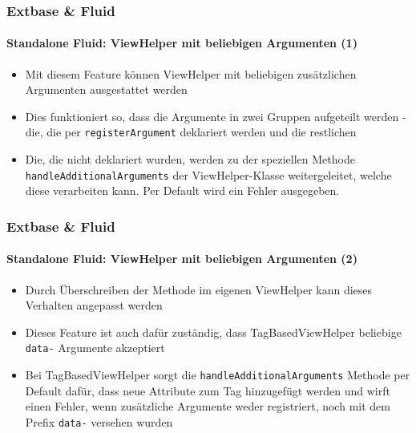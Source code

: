 \begin{frame}[fragile]
	\frametitle{Extbase \& Fluid}
	\framesubtitle{Standalone Fluid: ViewHelper mit beliebigen Argumenten (1)}

	\begin{itemize}

		\item Mit diesem Feature können ViewHelper mit beliebigen zusätzlichen Argumenten ausgestattet werden

		\item Dies funktioniert so, dass die Argumente in zwei Gruppen aufgeteilt werden - die, die per \texttt{registerArgument} deklariert werden und die restlichen

		\item Die, die nicht deklariert wurden, werden zu der speziellen Methode 
			\texttt{handleAdditionalArguments} der ViewHelper-Klasse weitergeleitet, welche diese verarbeiten kann. Per Default wird ein Fehler ausgegeben.
	\end{itemize}

\end{frame}


\begin{frame}[fragile]
	\frametitle{Extbase \& Fluid}
	\framesubtitle{Standalone Fluid: ViewHelper mit beliebigen Argumenten (2)}

	\begin{itemize}

		\item Durch Überschreiben der Methode im eigenen ViewHelper kann dieses Verhalten angepasst werden

		\item Dieses Feature ist auch dafür zuständig, dass TagBasedViewHelper beliebige \texttt{data-} Argumente akzeptiert

		\item Bei TagBasedViewHelper sorgt die \texttt{handleAdditionalArguments} Methode per Default dafür, dass neue Attribute zum Tag hinzugefügt werden und wirft einen Fehler, wenn zusätzliche Argumente weder registriert, noch mit dem Prefix \texttt{data-} versehen wurden

	\end{itemize}

\end{frame}

